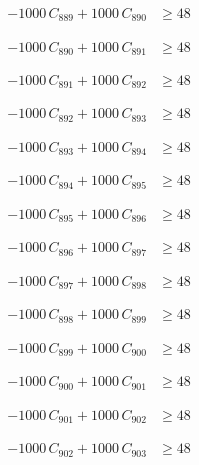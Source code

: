 \documentclass[a4paper,11pt]{article}
\begin{document}
\begin{align}
-1000\,C_{889} + 1000\,C_{890} &\geq 48 \nonumber
\end{align}

\begin{align}
-1000\,C_{890} + 1000\,C_{891} &\geq 48 \nonumber
\end{align}

\begin{align}
-1000\,C_{891} + 1000\,C_{892} &\geq 48 \nonumber
\end{align}

\begin{align}
-1000\,C_{892} + 1000\,C_{893} &\geq 48 \nonumber
\end{align}

\begin{align}
-1000\,C_{893} + 1000\,C_{894} &\geq 48 \nonumber
\end{align}

\begin{align}
-1000\,C_{894} + 1000\,C_{895} &\geq 48 \nonumber
\end{align}

\begin{align}
-1000\,C_{895} + 1000\,C_{896} &\geq 48 \nonumber
\end{align}

\begin{align}
-1000\,C_{896} + 1000\,C_{897} &\geq 48 \nonumber
\end{align}

\begin{align}
-1000\,C_{897} + 1000\,C_{898} &\geq 48 \nonumber
\end{align}

\begin{align}
-1000\,C_{898} + 1000\,C_{899} &\geq 48 \nonumber
\end{align}

\begin{align}
-1000\,C_{899} + 1000\,C_{900} &\geq 48 \nonumber
\end{align}

\begin{align}
-1000\,C_{900} + 1000\,C_{901} &\geq 48 \nonumber
\end{align}

\begin{align}
-1000\,C_{901} + 1000\,C_{902} &\geq 48 \nonumber
\end{align}

\begin{align}
-1000\,C_{902} + 1000\,C_{903} &\geq 48 \nonumber
\end{align}
\end{document}
